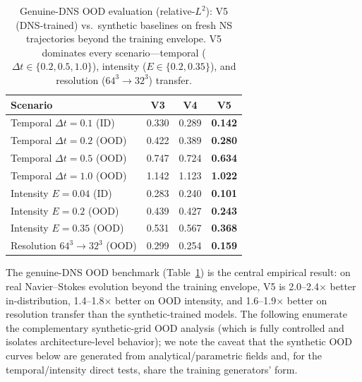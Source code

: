 \documentclass[review]{elsarticle}
\begin{document}
\begin{table}[t]
\centering
\caption{Genuine-DNS OOD evaluation (relative-$L^2$): V5 (DNS-trained) vs.\ synthetic baselines on fresh NS trajectories beyond the training envelope. V5 dominates every scenario---temporal ($\Delta t\in\{0.2,0.5,1.0\}$), intensity ($E\in\{0.2,0.35\}$), and resolution ($64^3\!\to\!32^3$) transfer.}
\label{tab:ood-dns}
\begin{tabular}{lccc}
\toprule
Scenario & V3 & V4 & V5 \\
\midrule
Temporal $\Delta t{=}0.1$ (ID) & 0.330 & 0.289 & \textbf{0.142} \\
Temporal $\Delta t{=}0.2$ (OOD) & 0.422 & 0.389 & \textbf{0.280} \\
Temporal $\Delta t{=}0.5$ (OOD) & 0.747 & 0.724 & \textbf{0.634} \\
Temporal $\Delta t{=}1.0$ (OOD) & 1.142 & 1.123 & \textbf{1.022} \\
Intensity $E{=}0.04$ (ID) & 0.283 & 0.240 & \textbf{0.101} \\
Intensity $E{=}0.2$ (OOD) & 0.439 & 0.427 & \textbf{0.243} \\
Intensity $E{=}0.35$ (OOD) & 0.531 & 0.567 & \textbf{0.368} \\
Resolution $64^3\!\to\!32^3$ (OOD) & 0.299 & 0.254 & \textbf{0.159} \\
\bottomrule
\end{tabular}
\end{table}

The genuine-DNS OOD benchmark (Table~\ref{tab:ood-dns}) is the central empirical result: on
real Navier--Stokes evolution beyond the training envelope, V5 is 2.0--2.4$\times$ better
in-distribution, 1.4--1.8$\times$ better on OOD intensity, and 1.6--1.9$\times$ better on
resolution transfer than the synthetic-trained models. The following enumerate the
complementary synthetic-grid OOD analysis (which is fully controlled and isolates
architecture-level behavior); we note the caveat that the synthetic OOD curves below are
generated from analytical/parametric fields and, for the temporal/intensity direct tests,
share the training generators' form.
\end{document}
